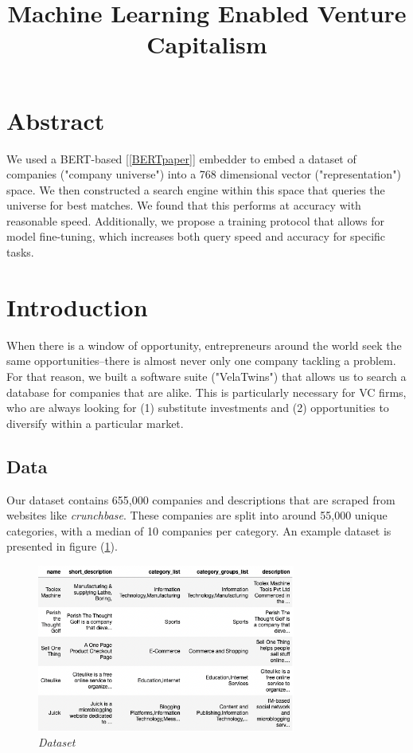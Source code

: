\documentclass[a4paper]{article}
\title{Machine Learning Enabled Venture Capitalism}
\begin{document}
\maketitle

\section*{Abstract}
We used a BERT-based [\ref{BERTpaper}] embedder to embed a dataset of companies ("company
universe") into a 768 dimensional vector ("representation") space. We then
constructed a search engine within this space that queries the universe for best
matches. We found that this performs at accuracy with reasonable speed.
Additionally, we propose a training protocol that allows for model fine-tuning,
which increases both query speed and accuracy for specific tasks.

\tableofcontents

\section{Introduction}
When there is a window of opportunity, entrepreneurs around the world
seek the same opportunities--there is almost never only one
company tackling a problem. For that reason, we built a software suite
("VelaTwins") that allows us to search a database for companies that are alike.
This is particularly necessary for VC firms, who are always looking for (1)
substitute investments and (2) opportunities to diversify within a particular market.

\subsection{Data}
Our dataset contains 655,000 companies and descriptions that are scraped from
websites like \emph{crunchbase}. These companies are split into around 55,000
unique categories, with a median of 10 companies per category. An example
dataset is presented in figure (\ref{datahead}).

\begin{figure}[!h]
    \centerline{\includegraphics[width=85mm]{datahead.png}}\caption{{\it Dataset}}
    \label{datahead}
\end{figure}
\end{document}
